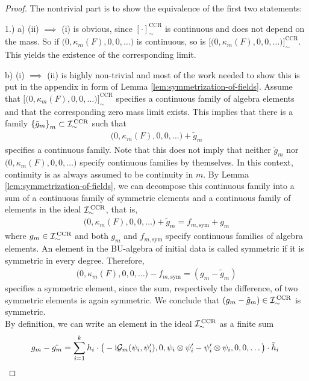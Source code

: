 \begin{proof}
	The nontrivial part is to show the equivalence of the first two statements:\par
	1.) a) (ii) $\implies$ (i) is obvious, since $[\cdot]_\sim^\text{CCR}$ is continuous and does not depend on the mass. So if $\big( 0 , \kappa_m(F) , 0 , 0, \dots\big)$ is continuous, so is $\big[\big( 0 , \kappa_m(F) , 0 , 0, \dots\big)\big]^\text{CCR}_\sim$. This yields the existence of the corresponding limit.\par
	b) (i) $\implies$ (ii) is highly non-trivial and most of the work needed to show this is put in the appendix in form of Lemma \ref{lem:symmetrization-of-fields}. Assume that $\big[\big( 0 , \kappa_m(F) , 0 , 0, \dots\big)\big]^\text{CCR}_\sim$ specifies a continuous family of algebra elements and that the corresponding zero mass limit exists. This implies that there is a family $\left\{\tilde{g}_m\right\}_m \subset {\mathcal{I}}_{\sim}^\text{\,CCR}$ such that
	\begin{align}
     \big( 0 , \kappa_m(F) , 0 , 0, \dots\big) + \tilde{g}_m
	\end{align}
	specifies a continuous family. Note that this does not imply that neither $\tilde{g}_m$ nor $\big( 0 , \kappa_m(F) , 0 , 0, \dots\big) $ specify continuous families by themselves. In this context, continuity is as always assumed to be continuity in $m$. By Lemma \ref{lem:symmetrization-of-fields}, we can decompose this continuous family into a sum of a continuous family of symmetric elements and a continuous family of elements in the ideal ${\mathcal{I}}_{\sim}^\text{\,CCR}$, that is,
	\begin{align}
     \big( 0 , \kappa_m(F) , 0 , 0, \dots\big) + \tilde{g}_m = f_{m,\text{sym}} + g_m
	\end{align}
	where $g_m \in {\mathcal{I}}_{\sim}^\text{\,CCR}$ and both $g_m$ and  $f_{m,\text{sym}}$ specify continuous families of algebra elements. An element in the BU-algebra of initial data is called symmetric if it is symmetric in every degree. Therefore,
	\begin{align}
\big( 0 , \kappa_m(F) , 0 , 0, \dots\big) - f_{m,\text{sym}} =  ( g_m -\tilde{g}_m)
	\end{align}
	specifies a symmetric element, since the sum, respectively the difference, of two symmetric elements is again symmetric. We conclude that $(g_m - \tilde{g}_m) \in {\mathcal{I}}_{\sim}^\text{\,CCR}$ is symmetric.\\
	By definition, we can write an element in the ideal ${\mathcal{I}}_{\sim}^\text{\,CCR}$ as a finite sum
	\begin{align}
		g_m - \tilde{g_m} = \sum_{i=1}^{k} h_i \cdot \big( -\i \mathcal{G}_m(\psi_i, \psi'_i) , 0 , \psi_i \otimes \psi'_i - \psi'_i \otimes \psi_i , 0 , 0 ,\dots  \big) \cdot \tilde{h}_i \formspace

\end{align}
\end{proof}
